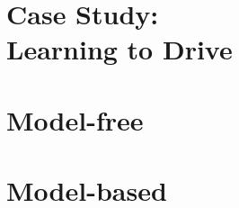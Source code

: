 \setcounter{mtc}{-1}
\adjustmtc




\part[Case Study: Learning to Drive]{Case Study:\\Learning to Drive}
\label{part:1}




\part{Model-free}
\label{part:2}




\part{Model-based}
\label{part:3}




